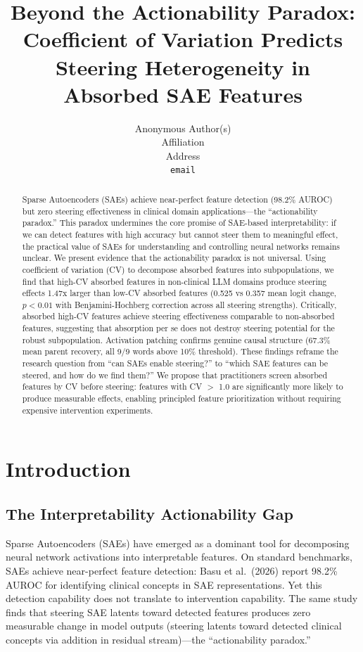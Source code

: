 \documentclass{article}
\title{Beyond the Actionability Paradox: Coefficient of Variation Predicts Steering Heterogeneity in Absorbed SAE Features}
\author{%
  Anonymous Author(s) \\
  Affiliation \\
  Address \\
  \texttt{email} \\
}
\begin{document}
\maketitle

\begin{abstract}
Sparse Autoencoders (SAEs) achieve near-perfect feature detection (98.2\% AUROC) but zero steering effectiveness in clinical domain applications---the ``actionability paradox.'' This paradox undermines the core promise of SAE-based interpretability: if we can detect features with high accuracy but cannot steer them to meaningful effect, the practical value of SAEs for understanding and controlling neural networks remains unclear. We present evidence that the actionability paradox is not universal. Using coefficient of variation (CV) to decompose absorbed features into subpopulations, we find that high-CV absorbed features in non-clinical LLM domains produce steering effects 1.47x larger than low-CV absorbed features (0.525 vs 0.357 mean logit change, $p < 0.01$ with Benjamini-Hochberg correction across all steering strengths). Critically, absorbed high-CV features achieve steering effectiveness comparable to non-absorbed features, suggesting that absorption per se does not destroy steering potential for the robust subpopulation. Activation patching confirms genuine causal structure (67.3\% mean parent recovery, all 9/9 words above 10\% threshold). These findings reframe the research question from ``can SAEs enable steering?'' to ``which SAE features can be steered, and how do we find them?'' We propose that practitioners screen absorbed features by CV before steering: features with CV $>$ 1.0 are significantly more likely to produce measurable effects, enabling principled feature prioritization without requiring expensive intervention experiments.
\end{abstract}

\section{Introduction}

\subsection{The Interpretability Actionability Gap}

Sparse Autoencoders (SAEs) have emerged as a dominant tool for decomposing neural network activations into interpretable features. On standard benchmarks, SAEs achieve near-perfect feature detection: Basu et al.\ (2026) report 98.2\% AUROC for identifying clinical concepts in SAE representations. Yet this detection capability does not translate to intervention capability. The same study finds that steering SAE latents toward detected features produces zero measurable change in model outputs (steering latents toward detected clinical concepts via addition in residual stream)---the ``actionability paradox.''
\end{document}
